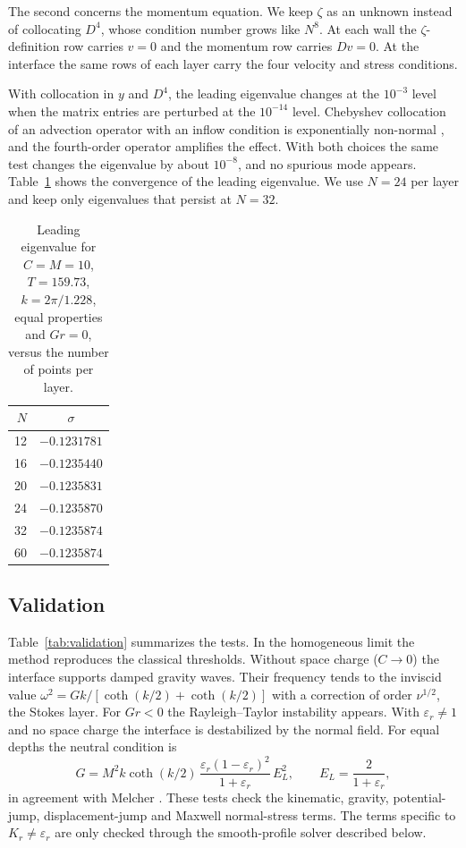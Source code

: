 \documentclass[aip,pof,reprint,amsmath,amssymb]{revtex4-2}
\begin{document}
The second concerns the momentum equation. We keep $\zeta$ as an unknown instead of
collocating $D^4$, whose condition number grows like $N^8$. At each wall the
$\zeta$-definition row carries $v=0$ and the momentum row carries $Dv=0$. At the interface
the same rows of each layer carry the four velocity and stress conditions.

With collocation in $y$ and $D^4$, the leading eigenvalue changes at the $10^{-3}$ level
when the matrix entries are perturbed at the $10^{-14}$ level. Chebyshev collocation of an
advection operator with an inflow condition is exponentially non-normal
\cite{TrefethenTrummer1987}, and the fourth-order operator amplifies the effect. With both
choices the same test changes the eigenvalue by about $10^{-8}$, and no spurious mode
appears. Table~\ref{tab:convergence} shows the convergence of the leading eigenvalue. We
use $N=24$ per layer and keep only eigenvalues that persist at $N=32$.

\begin{table}
\caption{Leading eigenvalue for $C=M=10$, $T=159.73$, $k=2\pi/1.228$, equal properties and
$Gr=0$, versus the number of points per layer.}
\label{tab:convergence}
\begin{ruledtabular}
\begin{tabular}{rc}
$N$ & $\sigma$\\\hline
12 & $-0.1231781$\\
16 & $-0.1235440$\\
20 & $-0.1235831$\\
24 & $-0.1235870$\\
32 & $-0.1235874$\\
60 & $-0.1235874$\\
\end{tabular}
\end{ruledtabular}
\end{table}

\subsection{Validation}

Table~\ref{tab:validation} summarizes the tests. In the homogeneous limit the method
reproduces the classical thresholds. Without space charge ($C\to0$) the interface supports
damped gravity waves. Their frequency tends to the inviscid value
$\omega^2=Gk/[\coth(k/2)+\coth(k/2)]$ with a correction of order $\nu^{1/2}$, the Stokes
layer. For $Gr<0$ the Rayleigh--Taylor instability appears. With $\varepsilon_r\ne1$ and no
space charge the interface is destabilized by the normal field. For equal depths the
neutral condition is
\begin{equation}
G=M^2k\coth(k/2)\,\frac{\varepsilon_r(1-\varepsilon_r)^2}{1+\varepsilon_r}\,E_L^2,\qquad
E_L=\frac{2}{1+\varepsilon_r},
\end{equation}
in agreement with Melcher \cite{Melcher1981}. These tests check the kinematic, gravity,
potential-jump, displacement-jump and Maxwell normal-stress terms. The terms specific to
$K_r\ne\varepsilon_r$ are only checked through the smooth-profile solver described below.
\end{document}
